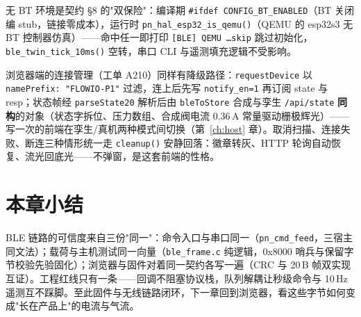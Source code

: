 无 BT 环境是契约 \S8 的"双保险"：编译期 \texttt{\#ifdef CONFIG\_BT\_ENABLED}（BT 关闭编 stub，链接零成本），运行时 \texttt{pn\_hal\_esp32\_is\_qemu()}（QEMU 的 esp32s3 无 BT 控制器仿真）——命中任一即打印 \texttt{[BLE] QEMU \dots skip} 跳过初始化，\texttt{ble\_twin\_tick\_10ms()} 空转，串口 CLI 与遥测填充逻辑不受影响。

浏览器端的连接管理（工单 A210）同样有降级路径：\texttt{requestDevice} 以 \texttt{namePrefix: "FLOWIO-P1"} 过滤，连上后先写 \texttt{notify\_en=1} 再订阅 state 与 resp；状态帧经 \texttt{parseState20} 解析后由 \texttt{bleToStore} 合成与孪生 \texttt{/api/state} \textbf{同构}的对象（状态字拆位、压力数组、合成阀电流 0.36\,A 常量驱动栅极辉光）——写一次的前端在孪生/真机两种模式间切换（第~\ref{ch:host} 章）。取消扫描、连接失败、断连三种情形统一走 \texttt{cleanup()} 安静回落：徽章转灰、HTTP 轮询自动恢复、流光回底光——不弹窗，是这套前端的性格。

\section*{本章小结}
BLE 链路的可信度来自三份"同一"：命令入口与串口同一（\texttt{pn\_cmd\_feed}，三宿主同文法）；载荷与主机测试同一向量（\texttt{ble\_frame.c} 纯逻辑，0x8000 哨兵与保留字节校验先验固化）；浏览器与固件对着同一契约各写一遍（CRC 与 20\,B 帧双实现互证）。工程红线只有一条——回调不阻塞协议栈，队列解耦让秒级命令与 10\,Hz 遥测互不踩脚。至此固件与无线链路闭环，下一章回到浏览器，看这些字节如何变成"长在产品上"的电流与气流。
